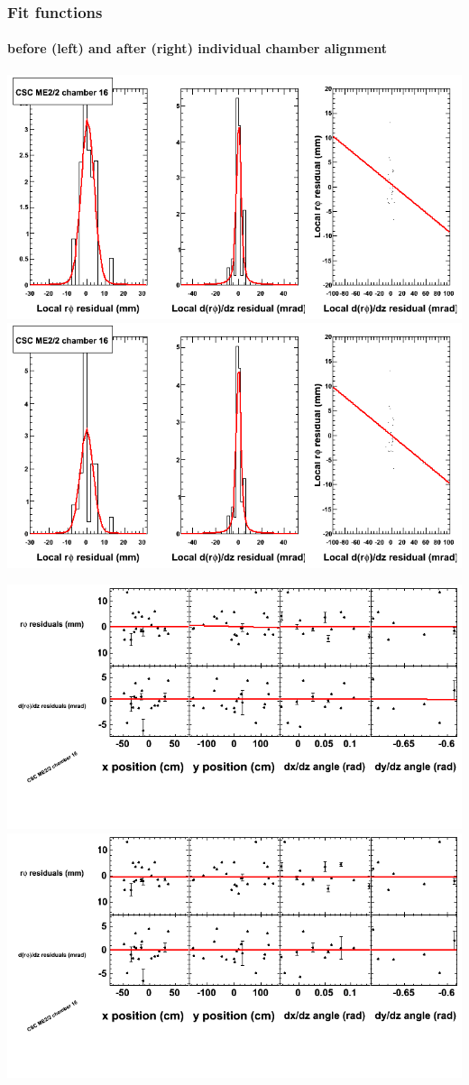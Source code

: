 \documentclass[compress]{beamer}
\begin{document}
\begin{frame}
\frametitle{Fit functions}
\framesubtitle{before (left) and after (right) individual chamber alignment}
\includegraphics[width=0.5\linewidth]{ringfits_3dof/beforefit_MEp22_16_bellcurve.png} \includegraphics[width=0.5\linewidth]{ringfits_3dof/afterfit_MEp22_16_bellcurve.png}

\includegraphics[width=0.5\linewidth]{ringfits_3dof/beforefit_MEp22_16_polynomials.png} \includegraphics[width=0.5\linewidth]{ringfits_3dof/afterfit_MEp22_16_polynomials.png}
\end{frame}
\end{document}
